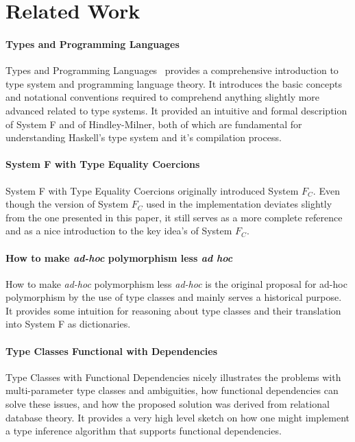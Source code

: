 \section{Related Work}

\paragraph{Types and Programming Languages}

Types and Programming Languages~\cite{pierce2002types} provides a comprehensive
introduction to type system and programming
language theory. It introduces the basic concepts and notational conventions
required to comprehend anything slightly more advanced related to type systems.
It provided an intuitive and formal description of System F and of
Hindley-Milner, both of which are fundamental for understanding Haskell's type
system and it's compilation process.

\paragraph{System F with Type Equality Coercions}

System F with Type Equality Coercions\cite{Sulzmann:2007:SFT:1190315.1190324}
originally introduced System $F_C$. Even though the version of System $F_C$ used
in the implementation deviates slightly from the one presented in this paper, it
still serves as a more complete reference and as a nice introduction to the key
idea's of System $F_C$.

\paragraph{How to make \textit{ad-hoc} polymorphism less \textit{ad hoc}}

How to make \textit{ad-hoc} polymorphism less
\textit{ad-hoc}\cite{Wadler:1989:MAP:75277.75283} is the original
proposal for ad-hoc polymorphism by the use of type classes and mainly serves a
historical purpose. It provides some intuition for reasoning about type classes
and their translation into System F as dictionaries.

\paragraph{Type Classes Functional with Dependencies}

Type Classes with Functional Dependencies\cite{Jones00typeclasses} nicely
illustrates the problems with multi-parameter type classes and ambiguities, how
functional dependencies can solve these issues, and how the proposed solution
was derived from relational database theory. It provides a very high level
sketch on how one might implement a type inference algorithm that supports
functional dependencies.

